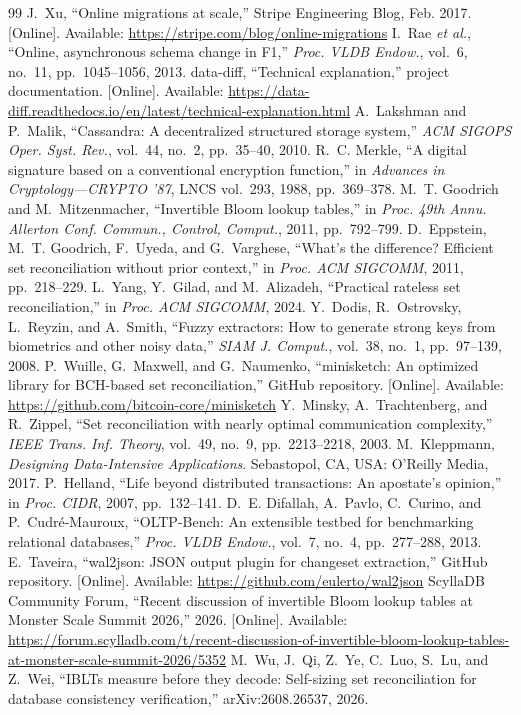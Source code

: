 \documentclass[conference]{IEEEtran}
\begin{document}
\begin{thebibliography}{99}
 J.~Xu, ``Online migrations at scale,'' Stripe Engineering Blog, Feb. 2017. [Online]. Available: \url{https://stripe.com/blog/online-migrations}
 I.~Rae \emph{et al.}, ``Online, asynchronous schema change in F1,'' \emph{Proc. VLDB Endow.}, vol.~6, no.~11, pp.~1045--1056, 2013.
 data-diff, ``Technical explanation,'' project documentation. [Online]. Available: \url{https://data-diff.readthedocs.io/en/latest/technical-explanation.html}
 A.~Lakshman and P.~Malik, ``Cassandra: A decentralized structured storage system,'' \emph{ACM SIGOPS Oper. Syst. Rev.}, vol.~44, no.~2, pp.~35--40, 2010.
 R.~C. Merkle, ``A digital signature based on a conventional encryption function,'' in \emph{Advances in Cryptology---CRYPTO '87}, LNCS vol.~293, 1988, pp.~369--378.
 M.~T. Goodrich and M.~Mitzenmacher, ``Invertible Bloom lookup tables,'' in \emph{Proc. 49th Annu. Allerton Conf. Commun., Control, Comput.}, 2011, pp.~792--799.
 D.~Eppstein, M.~T. Goodrich, F.~Uyeda, and G.~Varghese, ``What's the difference? Efficient set reconciliation without prior context,'' in \emph{Proc. ACM SIGCOMM}, 2011, pp.~218--229.
 L.~Yang, Y.~Gilad, and M.~Alizadeh, ``Practical rateless set reconciliation,'' in \emph{Proc. ACM SIGCOMM}, 2024.
 Y.~Dodis, R.~Ostrovsky, L.~Reyzin, and A.~Smith, ``Fuzzy extractors: How to generate strong keys from biometrics and other noisy data,'' \emph{SIAM J. Comput.}, vol.~38, no.~1, pp.~97--139, 2008.
 P.~Wuille, G.~Maxwell, and G.~Naumenko, ``minisketch: An optimized library for BCH-based set reconciliation,'' GitHub repository. [Online]. Available: \url{https://github.com/bitcoin-core/minisketch}
 Y.~Minsky, A.~Trachtenberg, and R.~Zippel, ``Set reconciliation with nearly optimal communication complexity,'' \emph{IEEE Trans. Inf. Theory}, vol.~49, no.~9, pp.~2213--2218, 2003.
 M.~Kleppmann, \emph{Designing Data-Intensive Applications}. Sebastopol, CA, USA: O'Reilly Media, 2017.
 P.~Helland, ``Life beyond distributed transactions: An apostate's opinion,'' in \emph{Proc. CIDR}, 2007, pp.~132--141.
 D.~E. Difallah, A.~Pavlo, C.~Curino, and P.~Cudr\'e-Mauroux, ``OLTP-Bench: An extensible testbed for benchmarking relational databases,'' \emph{Proc. VLDB Endow.}, vol.~7, no.~4, pp.~277--288, 2013.
 E.~Taveira, ``wal2json: JSON output plugin for changeset extraction,'' GitHub repository. [Online]. Available: \url{https://github.com/eulerto/wal2json}
 ScyllaDB Community Forum, ``Recent discussion of invertible Bloom lookup tables at Monster Scale Summit 2026,'' 2026. [Online]. Available: \url{https://forum.scylladb.com/t/recent-discussion-of-invertible-bloom-lookup-tables-at-monster-scale-summit-2026/5352}
 M.~Wu, J.~Qi, Z.~Ye, C.~Luo, S.~Lu, and Z.~Wei, ``IBLTs measure before they decode: Self-sizing set reconciliation for database consistency verification,'' arXiv:2608.26537, 2026.
\end{thebibliography}
\end{document}
